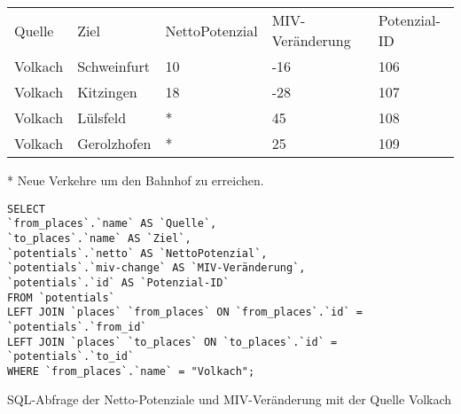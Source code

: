 \begin{tabular}{ l  l  l  l  l }
Quelle & Ziel & NettoPotenzial & MIV-Veränderung & Potenzial-ID\\ 
Volkach & Schweinfurt & 10 & -16 & 106\\ 
Volkach & Kitzingen & 18 & -28 & 107\\ 
Volkach & Lülsfeld & * & 45 & 108\\ 
Volkach & Gerolzhofen & * & 25 & 109\\ 
\end{tabular}
\newline
\newline
* Neue Verkehre um den Bahnhof zu erreichen.
\newline
\begin{listing}[htbp]
\begin{verbatim}
SELECT
`from_places`.`name` AS `Quelle`, 
`to_places`.`name` AS `Ziel`, 
`potentials`.`netto` AS `NettoPotenzial`, 
`potentials`.`miv-change` AS `MIV-Veränderung`, 
`potentials`.`id` AS `Potenzial-ID`
FROM `potentials`
LEFT JOIN `places` `from_places` ON `from_places`.`id` = `potentials`.`from_id`
LEFT JOIN `places` `to_places` ON `to_places`.`id` = `potentials`.`to_id`
WHERE `from_places`.`name` = "Volkach";
\end{verbatim}
\caption{SQL-Abfrage der Netto-Potenziale und MIV-Veränderung mit der Quelle Volkach}\label{lst-fz-volkach}
\end{listing}